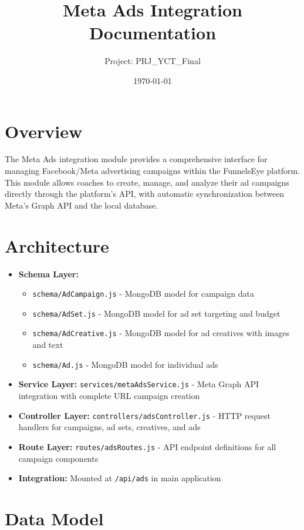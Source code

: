 \documentclass[11pt,a4paper]{article}
\title{\textbf{Meta Ads Integration Documentation}}
\author{Project: PRJ\_YCT\_Final}
\date{\today}
\begin{document}
\maketitle
\tableofcontents
\newpage

\section{Overview}
The Meta Ads integration module provides a comprehensive interface for managing Facebook/Meta advertising campaigns within the FunnelsEye platform. This module allows coaches to create, manage, and analyze their ad campaigns directly through the platform's API, with automatic synchronization between Meta's Graph API and the local database.

\section{Architecture}
\begin{itemize}[noitemsep]
  \item \textbf{Schema Layer:} 
    \begin{itemize}
      \item \texttt{schema/AdCampaign.js} - MongoDB model for campaign data
      \item \texttt{schema/AdSet.js} - MongoDB model for ad set targeting and budget
      \item \texttt{schema/AdCreative.js} - MongoDB model for ad creatives with images and text
      \item \texttt{schema/Ad.js} - MongoDB model for individual ads
    \end{itemize}
  \item \textbf{Service Layer:} \texttt{services/metaAdsService.js} - Meta Graph API integration with complete URL campaign creation
  \item \textbf{Controller Layer:} \texttt{controllers/adsController.js} - HTTP request handlers for campaigns, ad sets, creatives, and ads
  \item \textbf{Route Layer:} \texttt{routes/adsRoutes.js} - API endpoint definitions for all campaign components
  \item \textbf{Integration:} Mounted at \texttt{/api/ads} in main application
\end{itemize}

\section{Data Model}
\end{document}
